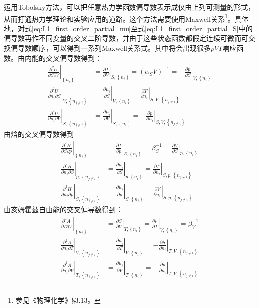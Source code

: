 \documentclass[main.tex]{subfiles}
\begin{document}
运用Tobolsky方法\cite{Tobolsky1942}，可以把任意热力学函数偏导数表示成仅由上列可测量的形式，从而打通热力学理论和实验应用的道路。这个方法需要使用Maxwell关系\footnote{参见《物理化学》\S 3.13。}。具体地，对式\eqref{eq:I.1_first_order_partial_mu}至式\eqref{eq:I.1_first_order_partial_S}中的偏导数再作不同变量的交叉二阶导数，并由于这些状态函数都假定连续可微而可交换偏导数顺序，可以得到一系列Maxwell关系式。其中将会出现很多$pVT$响应函数。由内能的交叉偏导数得到：
\begin{align}
    \left.\frac{\partial^2 U}{\partial S\partial V}\right|_{\left\{n_i\right\}}             & =\left.\frac{\partial T}{\partial V}\right|_{S,\left\{n_i\right\}}=\left(\alpha_S V\right)^{-1}=-\left.\frac{\partial p}{\partial S}\right|_{V,\left\{n_i\right\}} \\
    \left.\frac{\partial ^2U}{\partial n_i\partial S}\right|_{V,\left\{n_{j\neq i}\right\}} & =\left.\frac{\partial \mu_i}{\partial S}\right|_{V,\left\{n_i\right\}}=\left.\frac{\partial T}{\partial n_i}\right|_{S,V,\left\{n_{j\neq i}\right\}}               \\
    \left.\frac{\partial ^2U}{\partial n_i\partial V}\right|_{S,\left\{n_{j\neq i}\right\}} & =\left.\frac{\partial \mu_i}{\partial V}\right|_{S,\left\{n_i\right\}}=-\left.\frac{\partial p}{\partial n_i}\right|_{S,V,\left\{n_{j\neq i}\right\}}
\end{align}
由焓的交叉偏导数得到
\begin{align}
    \left.\frac{\partial^2 H}{\partial S\partial p}\right|_{\left\{n_i\right\}}             & =\left.\frac{\partial T}{\partial p}\right|_{S,\left\{n_i\right\}}=\beta_S^{-1}=\left.\frac{\partial V}{\partial S}\right|_{p,\left\{n_i\right\}}    \\
    \left.\frac{\partial ^2H}{\partial n_i\partial S}\right|_{p,\left\{n_{j\neq i}\right\}} & =\left.\frac{\partial \mu_i}{\partial S}\right|_{p,\left\{n_i\right\}}=\left.\frac{\partial T}{\partial n_i}\right|_{S,p,\left\{n_{j\neq i}\right\}} \\
    \left.\frac{\partial ^2H}{\partial n_i\partial p}\right|_{S,\left\{n_{j\neq i}\right\}} & =\left.\frac{\partial \mu_i}{\partial p}\right|_{S,\left\{n_i\right\}}=\left.\frac{\partial V}{\partial n_i}\right|_{S,p,\left\{n_{j\neq i}\right\}}
\end{align}
由亥姆霍兹自由能的交叉偏导数得到：
\begin{align}
    \left.\frac{\partial^2 A}{\partial T\partial V}\right|_{\left\{n_i\right\}}             & =\left.\frac{\partial S}{\partial V}\right|_{T,\left\{n_i\right\}}=\left.\frac{\partial p}{\partial T}\right|_{V,\left\{n_i\right\}}=\beta_V^{-1}     \\
    \left.\frac{\partial ^2A}{\partial n_i\partial T}\right|_{V,\left\{n_{j\neq i}\right\}} & =\left.\frac{\partial \mu_i}{\partial T}\right|_{V,\left\{n_i\right\}}=-\left.\frac{\partial S}{\partial n_i}\right|_{T,V,\left\{n_{j\neq i}\right\}} \\
    \left.\frac{\partial ^2A}{\partial n_i\partial V}\right|_{T,\left\{n_{j\neq i}\right\}} & =\left.\frac{\partial \mu_i}{\partial V}\right|_{T,\left\{n_i\right\}}=-\left.\frac{\partial p}{\partial n_i}\right|_{T,V,\left\{n_{j\neq i}\right\}}
\end{align}
\end{document}
